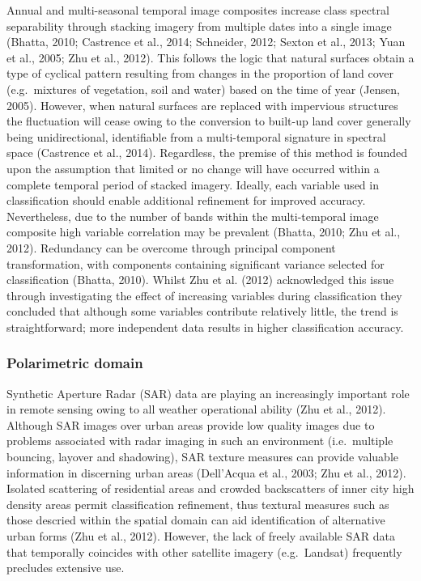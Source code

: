 \documentclass[]{book}
\begin{document}
Annual and multi-seasonal temporal image composites increase class
spectral separability through stacking imagery from multiple dates into
a single image (Bhatta, 2010; Castrence et al., 2014; Schneider, 2012;
Sexton et al., 2013; Yuan et al., 2005; Zhu et al., 2012). This follows
the logic that natural surfaces obtain a type of cyclical pattern
resulting from changes in the proportion of land cover (e.g.~mixtures of
vegetation, soil and water) based on the time of year (Jensen, 2005).
However, when natural surfaces are replaced with impervious structures
the fluctuation will cease owing to the conversion to built-up land
cover generally being unidirectional, identifiable from a multi-temporal
signature in spectral space (Castrence et al., 2014). Regardless, the
premise of this method is founded upon the assumption that limited or no
change will have occurred within a complete temporal period of stacked
imagery. Ideally, each variable used in classification should enable
additional refinement for improved accuracy. Nevertheless, due to the
number of bands within the multi-temporal image composite high variable
correlation may be prevalent (Bhatta, 2010; Zhu et al., 2012).
Redundancy can be overcome through principal component transformation,
with components containing significant variance selected for
classification (Bhatta, 2010). Whilst Zhu et al. (2012) acknowledged
this issue through investigating the effect of increasing variables
during classification they concluded that although some variables
contribute relatively little, the trend is straightforward; more
independent data results in higher classification accuracy.

\subsubsection{Polarimetric domain}\label{polarimetric-domain}

Synthetic Aperture Radar (SAR) data are playing an increasingly
important role in remote sensing owing to all weather operational
ability (Zhu et al., 2012). Although SAR images over urban areas provide
low quality images due to problems associated with radar imaging in such
an environment (i.e.~multiple bouncing, layover and shadowing), SAR
texture measures can provide valuable information in discerning urban
areas (Dell'Acqua et al., 2003; Zhu et al., 2012). Isolated scattering
of residential areas and crowded backscatters of inner city high density
areas permit classification refinement, thus textural measures such as
those descried within the spatial domain can aid identification of
alternative urban forms (Zhu et al., 2012). However, the lack of freely
available SAR data that temporally coincides with other satellite
imagery (e.g.~Landsat) frequently precludes extensive use.
\end{document}
